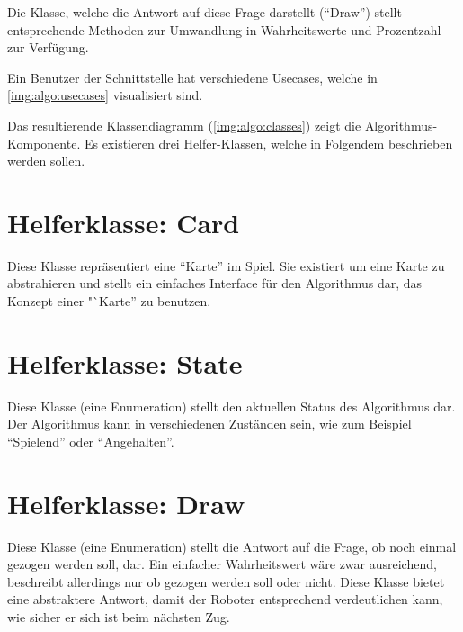     Die Klasse, welche die Antwort auf diese Frage darstellt (``Draw'') stellt
    entsprechende Methoden zur Umwandlung in Wahrheitswerte und Prozentzahl
    zur Verfügung.

    Ein Benutzer der Schnittstelle hat verschiedene Usecases, welche in
    \autoref{img:algo:usecases} visualisiert sind.

    Das resultierende Klassendiagramm (\autoref{img:algo:classes}) zeigt die
    Algorithmus-Komponente.
    Es existieren drei Helfer-Klassen, welche in Folgendem beschrieben werden
    sollen.

    \section{Helferklasse: Card}

        Diese Klasse repräsentiert eine ``Karte'' im Spiel.
        Sie existiert um eine Karte zu abstrahieren und stellt ein einfaches
        Interface für den Algorithmus dar, das Konzept einer "`Karte'' zu
        benutzen.

    \section{Helferklasse: State}

        Diese Klasse (eine Enumeration) stellt den aktuellen Status des
        Algorithmus dar.
        Der Algorithmus kann in verschiedenen Zuständen sein, wie zum Beispiel
        ``Spielend'' oder ``Angehalten''.

    \section{Helferklasse: Draw}

        Diese Klasse (eine Enumeration) stellt die Antwort auf die Frage, ob
        noch einmal gezogen werden soll, dar.
        Ein einfacher Wahrheitswert wäre zwar ausreichend, beschreibt allerdings
        nur ob gezogen werden soll oder nicht.
        Diese Klasse bietet eine abstraktere Antwort, damit der Roboter
        entsprechend verdeutlichen kann, wie sicher er sich ist beim nächsten
        Zug.


